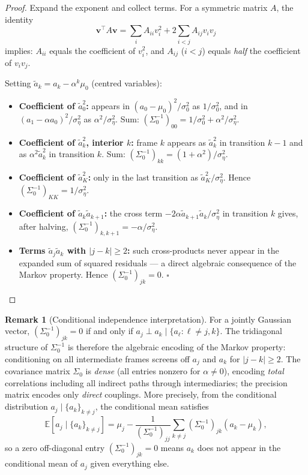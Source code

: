 \documentclass[12pt, a4paper]{article}
\theoremstyle{definition}
\newtheorem{remark}{Remark}[section]
\newcommand{\E}{\mathbb{E}}
\begin{document}
\begin{proof}
Expand the exponent and collect terms. For a symmetric matrix $A$, the
identity
\[
  \mathbf{v}^\top A \mathbf{v}
  = \sum_i A_{ii}v_i^2 + 2\sum_{i<j}A_{ij}v_iv_j
\]
implies: $A_{ii}$ equals the coefficient of $v_i^2$, and $A_{ij}$ ($i<j$)
equals \emph{half} the coefficient of $v_iv_j$.

Setting $\tilde{a}_k = a_k - \alpha^k\mu_0$ (centred variables):

\begin{itemize}
  \item \textbf{Coefficient of $\tilde{a}_0^2$:} appears in
    $(a_0-\mu_0)^2/\sigma_0^2$ as $1/\sigma_0^2$, and in
    $(a_1 - \alpha a_0)^2/\sigma_\eta^2$ as $\alpha^2/\sigma_\eta^2$.
    Sum: $(\Sigma_0^{-1})_{00} = 1/\sigma_0^2 + \alpha^2/\sigma_\eta^2$.

  \item \textbf{Coefficient of $\tilde{a}_k^2$, interior $k$:} frame $k$
    appears as $\tilde{a}_k^2$ in transition $k-1$ and as
    $\alpha^2\tilde{a}_k^2$ in transition $k$. Sum:
    $(\Sigma_0^{-1})_{kk} = (1+\alpha^2)/\sigma_\eta^2$.

  \item \textbf{Coefficient of $\tilde{a}_K^2$:} only in the last
    transition as $\tilde{a}_K^2/\sigma_\eta^2$.
    Hence $(\Sigma_0^{-1})_{KK} = 1/\sigma_\eta^2$.

  \item \textbf{Coefficient of $\tilde{a}_k\tilde{a}_{k+1}$:} the cross
    term $-2\alpha\tilde{a}_{k+1}\tilde{a}_k/\sigma_\eta^2$ in transition
    $k$ gives, after halving, $(\Sigma_0^{-1})_{k,k+1} = -\alpha/\sigma_\eta^2$.

  \item \textbf{Terms $\tilde{a}_j\tilde{a}_k$ with $|j-k|\geq 2$:}
    such cross-products never appear in the expanded sum of squared
    residuals — a direct algebraic consequence of the Markov property.
    Hence $(\Sigma_0^{-1})_{jk} = 0$. \qquad$\square$
\end{itemize}
\end{proof}

\begin{remark}[Conditional independence interpretation]
For a jointly Gaussian vector, $(\Sigma_0^{-1})_{jk} = 0$ if and only if
$a_j \perp a_k \mid \{a_\ell : \ell \neq j, k\}$. The tridiagonal
structure of $\Sigma_0^{-1}$ is therefore the algebraic encoding of the
Markov property: conditioning on all intermediate frames screens off
$a_j$ and $a_k$ for $|j-k|\geq 2$. The covariance matrix $\Sigma_0$ is
\emph{dense} (all entries nonzero for $\alpha\neq 0$), encoding
\emph{total} correlations including all indirect paths through
intermediaries; the precision matrix encodes only \emph{direct} couplings.
More precisely, from the conditional distribution $a_j \mid \{a_k\}_{k\neq j}$,
the conditional mean satisfies
\[
  \E\!\left[a_j \mid \{a_k\}_{k\neq j}\right]
  = \mu_j - \frac{1}{(\Sigma_0^{-1})_{jj}}\sum_{k\neq j}
    (\Sigma_0^{-1})_{jk}(a_k - \mu_k),
\]
so a zero off-diagonal entry $(\Sigma_0^{-1})_{jk}=0$ means $a_k$ does not
appear in the conditional mean of $a_j$ given everything else.
\end{remark}
\end{document}
